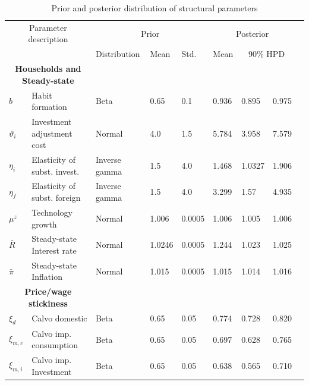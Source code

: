 \documentclass[12pt,oneside,a4paper]{article}
\begin{document}
\begin{table}[H]
\centering
\caption{Prior and posterior distribution of structural parameters}
\label{table:prior_posterior_structural_parameters}
\begin{tabular}{lllllllll}
\hline
\multicolumn{2}{c}{Parameter description}                            & \multicolumn{3}{c}{Prior }  & \multicolumn{3}{c}{Posterior}         \\ 
                &                                        & Distribution    & Mean    & Std. &   Mean    & \multicolumn{2}{c}{ 90\% HPD}  \\
\hline
\multicolumn{2}{c}{\textbf{Households and Steady-state}} &                 &         &        &         &           &        \\
$b$               & Habit formation                        & Beta            & 0.65    & 0.1    &  0.936  & 0.895    & 0.975 \\
$\vartheta_{i}$     & Investment adjustment cost             & Normal          & 4.0     & 1.5    &  5.784  & 3.958    & 7.579 \\
$\eta_i$           & Elasticity of subst. invest.  & Inverse gamma   & 1.5     & 4.0    &  1.468   & 1.0327    & 1.906 \\
$\eta_f$           & Elasticity of subst. foreign     & Inverse gamma   & 1.5     & 4.0    &  3.299   & 1.57    & 4.935 \\
$\mu^{z}$            & Technology growth                      & Normal          & 1.006   & 0.0005 &  1.006   & 1.005    & 1.006 \\
$\bar{R}$               & Steady-state Interest rate             & Normal          & 1.0246  & 0.0005 &  1.244   & 1.023    & 1.025 \\
$\bar{\pi}$              & Steady-state Inflation                 & Normal          & 1.015  & 0.0005 &  1.015   & 1.014    & 1.016 \\
\multicolumn{2}{c}{\textbf{Price/wage stickiness}}       &                 &         &        &         &           &        \\
$\xi_d$            & Calvo domestic                         & Beta            & 0.65    & 0.05   &  0.774  & 0.728    & 0.820 \\
$\xi_{m,c}$           & Calvo imp. consumption                 & Beta            & 0.65    & 0.05   &  0.697  & 0.628    & 0.765 \\
$\xi_{m,i}$           & Calvo imp. Investment                  & Beta            & 0.65    & 0.05   &  0.638  & 0.565    & 0.710 \\

\end{tabular}
\end{table}
\end{document}
